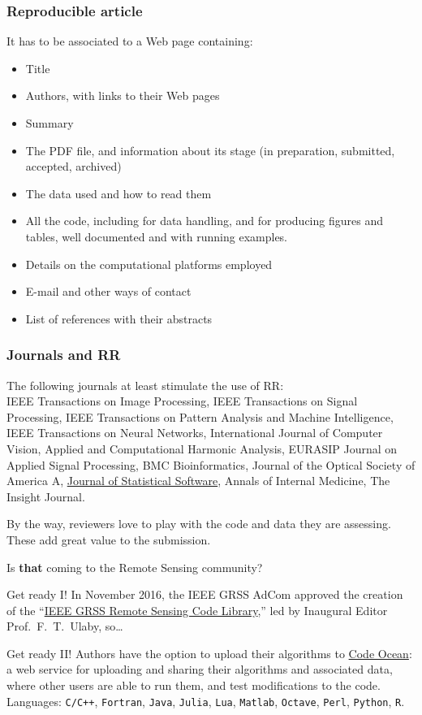 \documentclass[professionalfonts,table,serif,aspectratio=1610]{beamer}
\begin{document}
\begin{frame}
 \frametitle{Reproducible article}
It has to be associated to a Web page containing:
\begin{itemize}[<+-| alert@+>]
\item Title
\item Authors, with links to their Web pages
\item Summary
\item The PDF file, and information about its stage (in preparation, submitted, accepted, archived)
\item The data used and how to read them
\item All the code, including for data handling, and for producing figures and tables, well documented and with running examples.
\item Details on the computational platforms employed
\item E-mail and other ways of contact
\item List of references with their abstracts
\end{itemize}
\end{frame}

\begin{frame}
 \frametitle{Journals and RR}
The following journals \alert{at least} stimulate the use of RR:\\
IEEE Transactions on Image Processing, IEEE Transactions on Signal Processing, IEEE Transactions on Pattern Analysis and Machine Intelligence, IEEE Transactions on Neural Networks, International Journal of Computer Vision, Applied and Computational Harmonic Analysis, EURASIP Journal on Applied Signal Processing, BMC Bioinformatics, Journal of the Optical Society of America A, \href{http://www.jstatsoft.org/v34/i04}{Journal of Statistical Software}, Annals of Internal Medicine, The Insight Journal.

By the way, reviewers love to play with the code and data they are assessing.
These add great value to the submission. 
\end{frame}

\begin{frame}{Is \textbf{that} coming to the Remote Sensing community?}
\begin{alertblock}{Get ready I!}
In November 2016, the IEEE GRSS AdCom approved the creation of the ``\href{https://rscl-grss.org}{IEEE GRSS Remote Sensing Code Library},'' led by Inaugural Editor \mbox{Prof.\ F.\ T.\ Ulaby}, so\dots
\end{alertblock}

\begin{alertblock}{Get ready II!}
Authors have the option to upload their algorithms to \href{https://codeocean.com/ieee/signup}{Code Ocean}: a web service for uploading and sharing their algorithms and associated data, where other users are able to run them, and test modifications to the code.
Languages: \texttt{C/C++}, \texttt{Fortran}, \texttt{Java}, \texttt{Julia}, \texttt{Lua}, \texttt{Matlab}, \texttt{Octave}, \texttt{Perl}, \texttt{Python}, \texttt{R}.
\end{alertblock}
\end{frame}
\end{document}
